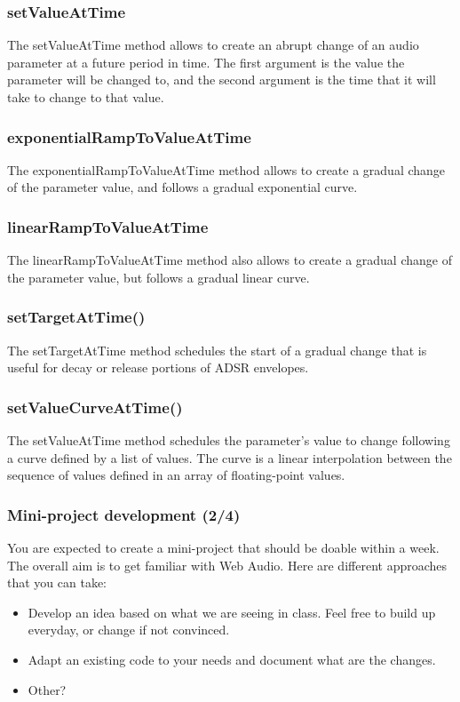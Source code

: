 \documentclass[screen, aspectratio=43]{beamer}
\begin{document}
%
\begin{frame}
\frametitle{setValueAtTime}
The \textrm{setValueAtTime} method allows to create an abrupt change of an audio parameter at a future period in time.  The first argument is the value the parameter will be changed to, and the second argument is the time that it will take to change to that value.
\end{frame}
%
\begin{frame}
\frametitle{exponentialRampToValueAtTime }
The \textrm{exponentialRampToValueAtTime} method allows to create a gradual change of the parameter value, and follows a gradual exponential curve.

\end{frame}
%
\begin{frame}
\frametitle{linearRampToValueAtTime}
The \textrm{linearRampToValueAtTime} method also allows to create a gradual change of the parameter value, but follows a gradual linear curve.
\end{frame}
%
\begin{frame}
\frametitle{setTargetAtTime()}
The \textrm{setTargetAtTime} method schedules the start of a gradual change that is useful for decay or release portions of ADSR envelopes.
\end{frame}
%
\begin{frame}
\frametitle{setValueCurveAtTime()}
The \textrm{setValueAtTime} method schedules the parameter's value to change following a curve defined by a list of values. The curve is a linear interpolation between the sequence of values defined in an array of floating-point values.
\end{frame}
%	
\begin{frame}
\frametitle{Mini-project development (2/4)}
You are expected to create a mini-project that should be doable within a week. The overall aim is to get familiar with Web Audio. Here are different approaches that you can take:
\begin{itemize}
\item Develop an idea based on what we are seeing in class. Feel free to build up everyday, or change if not convinced.
\item Adapt an existing code to your needs and document what are the changes.
\item Other?
\end{itemize}
\end{frame}
\end{document}
